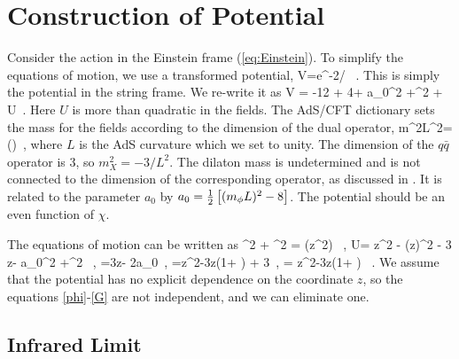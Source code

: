 \section{Construction of Potential}
\label{sec:potential}

Consider the action in the Einstein frame (\ref{eq:Einstein}).
To simplify the equations of motion, we use a transformed potential, 
\be
V=e^{-2\phi/} \, .
\label{transform}
\ee
This is simply the potential in the string frame.
We re-write it as
\be
V = -12 + 4\phi + a_0\phi^2 +\chi^2 + U \,.
\label{V}
\ee
Here $U$ is more than quadratic in the fields. 
 The AdS/CFT dictionary sets the mass for the fields according to the dimension of the dual operator,
\be
m^2L^2=\Delta() \,,
\ee
where $L$ is the AdS curvature which we set to unity.  The dimension of the $q\bar{q}$ operator is 3, so $m_X^2 = -3/L^2$.
The dilaton mass is undetermined and is not connected to the dimension of the corresponding operator, as discussed in \cite{Springer2010}.  
It is related to the parameter $a_0$ by $a_0 = \thalf \left[ \mL2-8 \right]$. 
The potential should be an even function of $\chi$. 

The equations of motion can be written as
\be
\chidot^2 + \Gdot^2 =  \Dz(z^2\phidot) \, ,
\label{C}
\ee
\be
U=\thalf {} z^2 \phiddot - \tthalf (z\phidot)^2 - 3  z\phi - a_0\phi^2 +\tthalf\chi^2 \, ,
\label{U}
\ee
\be
 =3z\phidot - 2a_0\phi \, ,
\label{phi}
\ee
\be
=z^2\chiddot -3z\chidot \left(1+ \right) + 3\chi \, ,
\label{chi}
\ee
\be
 =
z^2\Gddot -3z\Gdot \left(1+ \right) \, .
\label{G}
\ee
We assume that the potential has no explicit dependence on the coordinate $z$,  so the equations \ref{phi}-\ref{G} are not independent, and we can eliminate one. 

\subsection{Infrared Limit}


